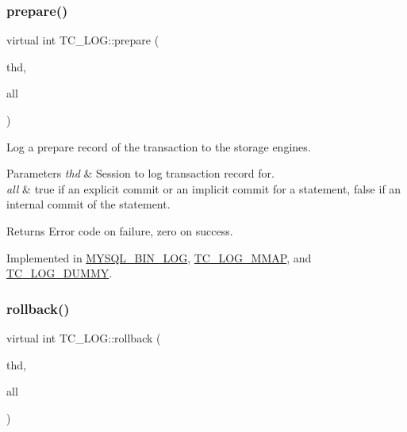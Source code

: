 \mbox{\label{classTC__LOG_ab968f1e200f370127c3dcd0302d00968}} 
\subsubsection{\texorpdfstring{prepare()}{prepare()}}
{\footnotesize\ttfamily virtual int T\+C\+\_\+\+L\+O\+G\+::prepare (\begin{DoxyParamCaption}\item[{T\+HD $\ast$}]{thd,  }\item[{bool}]{all }\end{DoxyParamCaption})\hspace{0.3cm}{\ttfamily [pure virtual]}}

Log a prepare record of the transaction to the storage engines.


\begin{DoxyParams}{Parameters}
{\em thd} & Session to log transaction record for.\\
\hline
{\em all} & {\ttfamily true} if an explicit commit or an implicit commit for a statement, {\ttfamily false} if an internal commit of the statement.\\
\hline
\end{DoxyParams}
\begin{DoxyReturn}{Returns}
Error code on failure, zero on success. 
\end{DoxyReturn}


Implemented in \mbox{\hyperlink{group__Binary__Log_ga4789039161947fff76fa8250b120b7e3}{M\+Y\+S\+Q\+L\+\_\+\+B\+I\+N\+\_\+\+L\+OG}}, \mbox{\hyperlink{classTC__LOG__MMAP_a334d9853acc2f7b12ae2a3014806f6c4}{T\+C\+\_\+\+L\+O\+G\+\_\+\+M\+M\+AP}}, and \mbox{\hyperlink{classTC__LOG__DUMMY_a911680c1d0a8f4e5a028e2f1920ee2a2}{T\+C\+\_\+\+L\+O\+G\+\_\+\+D\+U\+M\+MY}}.

\mbox{\label{classTC__LOG_abf637f1bbf02c6f8e4f69aa2f5e2d362}} 
\subsubsection{\texorpdfstring{rollback()}{rollback()}}
{\footnotesize\ttfamily virtual int T\+C\+\_\+\+L\+O\+G\+::rollback (\begin{DoxyParamCaption}\item[{T\+HD $\ast$}]{thd,  }\item[{bool}]{all }\end{DoxyParamCaption})\hspace{0.3cm}{\ttfamily [pure virtual]}}

